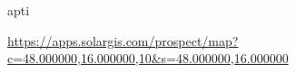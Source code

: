 apti     \documentclass[10pt,a4paper,UTF8]{article}
\begin{document}
{\begin{longtabu}
     \url{https://apps.solargis.com/prospect/map?c=48.000000,16.000000,10\&s=48.000000,16.000000}
     \\\hline 
    
%    
     \end{longtabu} 
    
%    

}
\end{document}

